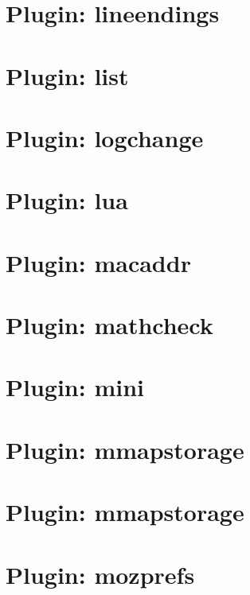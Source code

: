 \documentclass[twoside]{book}
\newcommand{\+}{\discretionary{\mbox{\scriptsize$\hookleftarrow$}}{}{}}
\begin{document}
\chapter{Plugin\+: lineendings}
\label{autotoc_md356}

\chapter{Plugin\+: list}
\label{autotoc_md358}

\chapter{Plugin\+: logchange}
\label{autotoc_md362}

\chapter{Plugin\+: lua}
\label{autotoc_md364}

\chapter{Plugin\+: macaddr}
\label{autotoc_md370}

\chapter{Plugin\+: mathcheck}
\label{autotoc_md374}

\chapter{Plugin\+: mini}
\label{autotoc_md377}

\chapter{Plugin\+: mmapstorage}
\label{autotoc_md404}

\chapter{Plugin\+: mmapstorage}
\label{autotoc_md417}

\chapter{Plugin\+: mozprefs}
\label{autotoc_md439}

\end{document}

